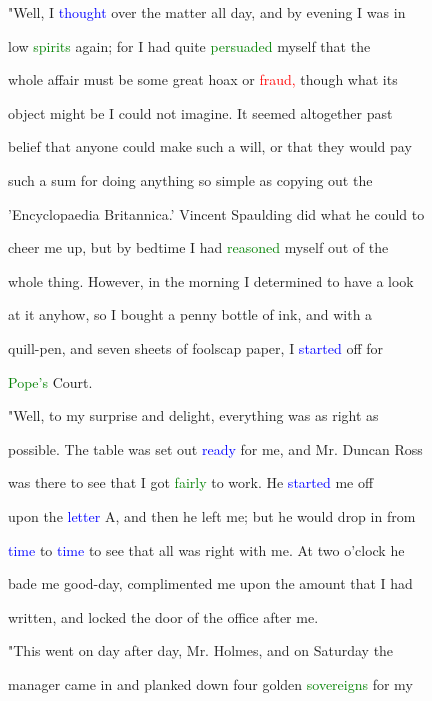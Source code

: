  "Well, I \textcolor{blue}{thought} over the matter all day, and by evening I was in

 low \textcolor{green}{spirits} again; for I had quite \textcolor{green}{persuaded} myself that the

 whole affair must be some great \textcolor{BurntOrange}{hoax} or \textcolor{red}{fraud,} though what its

 object might be I could not imagine. It seemed altogether past

 belief that anyone could make such a will, or that they would \textcolor{BurntOrange}{pay}

 such a sum for doing anything so simple as copying out the

 'Encyclopaedia Britannica.' Vincent Spaulding did what he could to

 \textcolor{BurntOrange}{cheer} me up, but by bedtime I had \textcolor{green}{reasoned} myself out of the

 whole thing. However, in the morning I determined to have a look

 at it anyhow, so I bought a penny bottle of ink, and with a

 quill-pen, and seven sheets of foolscap paper, I \textcolor{blue}{started} off for

 \textcolor{green}{Pope's} \textcolor{BurntOrange}{Court.}



 "Well, to my \textcolor{BurntOrange}{surprise} and \textcolor{BurntOrange}{delight,} everything was as right as

 possible. The table was set out \textcolor{blue}{ready} for me, and Mr. Duncan Ross

 was there to see that I got \textcolor{green}{fairly} to work. He \textcolor{blue}{started} me off

 upon the \textcolor{blue}{letter} A, and then he left me; but he would drop in from

 \textcolor{blue}{time} to \textcolor{blue}{time} to see that all was right with me. At two o'clock he

 bade me good-day, \textcolor{BurntOrange}{complimented} me upon the amount that I had

 written, and locked the door of the office after me.



 "This went on day after day, Mr. Holmes, and on Saturday the

 manager came in and planked down four golden \textcolor{green}{sovereigns} for my

